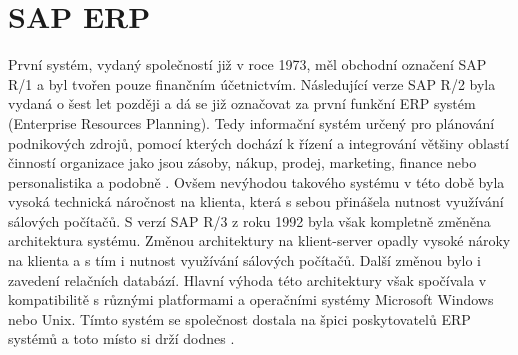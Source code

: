 \documentclass[thesis=M,czech]{FITthesis}[2012/06/26]
\begin{document}
\section{SAP ERP}
\label{sec:erp}
První systém, vydaný společností již v roce 1973, měl obchodní označení SAP R/1 a byl tvořen pouze finančním účetnictvím. Následující verze SAP R/2 byla vydaná o šest let později a dá se již označovat za první funkční ERP systém (Enterprise Resources Planning). Tedy informační systém určený pro plánování podnikových zdrojů, pomocí kterých dochází k řízení a integrování většiny oblastí činností organizace jako jsou zásoby, nákup, prodej, marketing, finance nebo personalistika a podobně \cite{erpforum_erp_definition}. Ovšem nevýhodou takového systému v této době byla vysoká technická náročnost na klienta, která s sebou přinášela nutnost využívání sálových počítačů. S verzí SAP R/3 z roku 1992 byla však kompletně změněna architektura systému. Změnou architektury na klient-server opadly vysoké nároky na klienta a s tím i nutnost využívání sálových počítačů. Další změnou bylo i zavedení relačních databází. Hlavní výhoda této architektury však spočívala v kompatibilitě s různými platformami a operačními systémy Microsoft Windows nebo Unix. Tímto systém se společnost dostala na špici poskytovatelů ERP systémů a toto místo si drží dodnes \cite{sap_information}.
\end{document}
